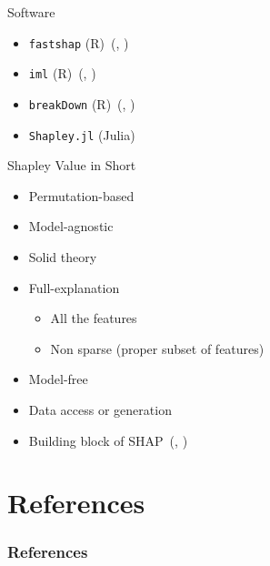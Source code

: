 \documentclass[dvipsnames]{beamer}
\renewcommand{\cite}[1]{(\citeauthor{#1}, \citeyear{#1})}
\begin{document}




%

\begin{frame}[fragile]{Software}
	\begin{itemize}\setlength\itemsep{2em}
		\item \verb|fastshap| (R)~\cite{jethani2021fastshap}
		\item \verb|iml| (R)~\cite{molnar2018iml}
		\item \verb|breakDown| (R)~\cite{staniak2018explanations}
		\item \verb|Shapley.jl| (Julia)~\footnotemark
	\end{itemize}
\end{frame}

\begin{frame}{Shapley Value in Short}
	\begin{itemize}\setlength\itemsep{1em}
		\item Permutation-based
		\item Model-agnostic
		\item Solid theory
		\item Full-explanation
		\begin{itemize}
			\item All the features
			\item Non sparse (proper subset of features)
		\end{itemize}
		\item Model-free
		\item Data access or generation
		\item Building block of SHAP~\cite{lundberg2017unified}
	\end{itemize}
\end{frame}

\section{References}
\begin{frame}[allowframebreaks]
\frametitle{References}
\printbibliography
\end{frame}
\end{document}
